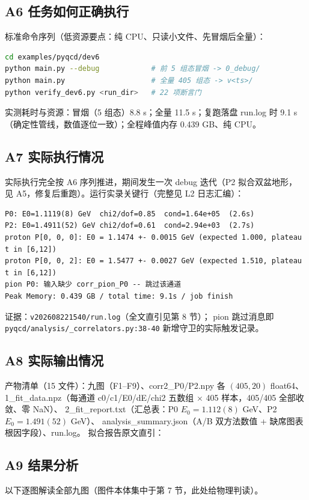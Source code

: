 \documentclass[UTF8]{ctexart}
\begin{document}
\subsection{A6 任务如何正确执行}
标准命令序列（低资源要点：纯 CPU、只读小文件、先冒烟后全量）：
\begin{lstlisting}[language=bash]
cd examples/pyqcd/dev6
python main.py --debug            # 前 5 组态冒烟 -> 0_debug/
python main.py                    # 全量 405 组态 -> v<ts>/
python verify_dev6.py <run_dir>   # 22 项断言门
\end{lstlisting}
实测耗时与资源：冒烟（5 组态）8.8 s；全量 11.5 s；复跑落盘 run.log 时 9.1 s
（确定性管线，数值逐位一致）；全程峰值内存 0.439 GB、纯 CPU。
\subsection{A7 实际执行情况}
实际执行完全按 A6 序列推进，期间发生一次 debug 迭代（P2 拟合双盆地形，
见 A5，修复后重跑）。运行实录关键行（完整见 L2 日志汇编）：
\begin{lstlisting}[language={}]
P0: E0=1.1119(8) GeV  chi2/dof=0.85  cond=1.64e+05  (2.6s)
P2: E0=1.4911(52) GeV chi2/dof=0.61  cond=2.94e+03  (2.7s)
proton P[0, 0, 0]: E0 = 1.1474 +- 0.0015 GeV (expected 1.000, plateau t in [6,12])
proton P[0, 0, 2]: E0 = 1.5477 +- 0.0027 GeV (expected 1.510, plateau t in [6,12])
pion P0: 输入缺少 corr_pion_P0 -- 跳过该通道
Peak Memory: 0.439 GB / total time: 9.1s / job finish
\end{lstlisting}
证据：\textcolor{evidence}{\texttt{\nolinkurl{v202608221540/run.log}}}（全文直引见第 8 节）；
pion 跳过消息即 \texttt{\nolinkurl{pyqcd/analysis/_correlators.py:38-40}} 新增守卫的实际触发记录。
\subsection{A8 实际输出情况}
产物清单（15 文件）：九图（F1--F9）、corr2\_P0/P2.npy 各 $(405,20)$ float64、
1\_fit\_data.npz（每通道 c0/c1/E0/dE/chi2 五数组 $\times$ 405 样本，405/405 全部收敛、零 NaN）、
2\_fit\_report.txt（汇总表：P0 $E_0=1.112(8)$ GeV、P2 $E_0=1.491(52)$ GeV）、
analysis\_summary.json（A/B 双方法数值 + 缺席图表根因字段）、run.log。
拟合报告原文直引：

\subsection{A9 结果分析}
以下逐图解读全部九图（图件本体集中于第 7 节，此处给物理判读）。
\end{document}
